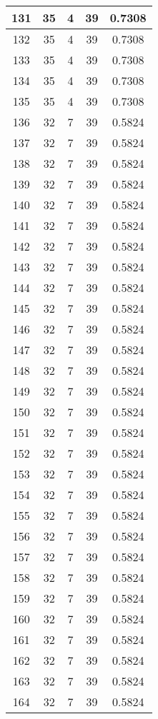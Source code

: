 \documentclass[letterpaper, 12pt]{article}
\begin{document}
\begin{longtable}{|c|c|c|c|c|}
\hline
131 & 35 & 4 & 39 & 0.7308 \\
\hline
132 & 35 & 4 & 39 & 0.7308 \\
\hline
133 & 35 & 4 & 39 & 0.7308 \\
\hline
134 & 35 & 4 & 39 & 0.7308 \\
\hline
135 & 35 & 4 & 39 & 0.7308 \\
\hline
136 & 32 & 7 & 39 & 0.5824 \\
\hline
137 & 32 & 7 & 39 & 0.5824 \\
\hline
138 & 32 & 7 & 39 & 0.5824 \\
\hline
139 & 32 & 7 & 39 & 0.5824 \\
\hline
140 & 32 & 7 & 39 & 0.5824 \\
\hline
141 & 32 & 7 & 39 & 0.5824 \\
\hline
142 & 32 & 7 & 39 & 0.5824 \\
\hline
143 & 32 & 7 & 39 & 0.5824 \\
\hline
144 & 32 & 7 & 39 & 0.5824 \\
\hline
145 & 32 & 7 & 39 & 0.5824 \\
\hline
146 & 32 & 7 & 39 & 0.5824 \\
\hline
147 & 32 & 7 & 39 & 0.5824 \\
\hline
148 & 32 & 7 & 39 & 0.5824 \\
\hline
149 & 32 & 7 & 39 & 0.5824 \\
\hline
150 & 32 & 7 & 39 & 0.5824 \\
\hline
151 & 32 & 7 & 39 & 0.5824 \\
\hline
152 & 32 & 7 & 39 & 0.5824 \\
\hline
153 & 32 & 7 & 39 & 0.5824 \\
\hline
154 & 32 & 7 & 39 & 0.5824 \\
\hline
155 & 32 & 7 & 39 & 0.5824 \\
\hline
156 & 32 & 7 & 39 & 0.5824 \\
\hline
157 & 32 & 7 & 39 & 0.5824 \\
\hline
158 & 32 & 7 & 39 & 0.5824 \\
\hline
159 & 32 & 7 & 39 & 0.5824 \\
\hline
160 & 32 & 7 & 39 & 0.5824 \\
\hline
161 & 32 & 7 & 39 & 0.5824 \\
\hline
162 & 32 & 7 & 39 & 0.5824 \\
\hline
163 & 32 & 7 & 39 & 0.5824 \\
\hline
164 & 32 & 7 & 39 & 0.5824 \\

\end{longtable}
\end{document}
